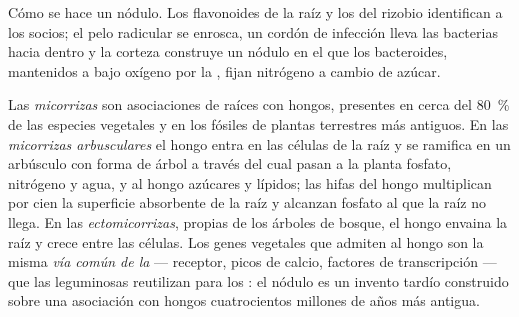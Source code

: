 \begin{omfigure}
{\small Cómo se hace un nódulo. Los flavonoides de la raíz y los  del rizobio identifican a los socios; el pelo radicular se enrosca,
un cordón de infección lleva las bacterias hacia dentro y la corteza
construye un nódulo en el que los bacteroides, mantenidos a bajo oxígeno
por la , fijan nitrógeno a cambio de azúcar.}
\end{omfigure}

\begin{definition}[Micorrizas]\label{def:b3:microbiomes:mycorrhiza}
Las \emph{micorrizas} son asociaciones de raíces con hongos, presentes en
cerca del \qty{80}{\%} de las especies vegetales y en los fósiles de
plantas terrestres más antiguos. En las \emph{micorrizas arbusculares} el
hongo entra en las células de la raíz y se ramifica en un arbúsculo con
forma de árbol a través del cual pasan a la planta fosfato, nitrógeno y
agua, y al hongo azúcares y lípidos; las hifas del hongo multiplican por
cien la superficie absorbente de la raíz y alcanzan fosfato al que la
raíz no llega. En las \emph{ectomicorrizas}, propias de los árboles de
bosque, el hongo envaina la raíz y crece entre las células. Los genes
vegetales que admiten al hongo son la misma \emph{vía común de la
} --- receptor, picos de calcio, factores de transcripción ---
que las leguminosas reutilizan para los : el nódulo es un invento
tardío construido sobre una asociación con hongos cuatrocientos millones
de años más antigua.
\end{definition}

